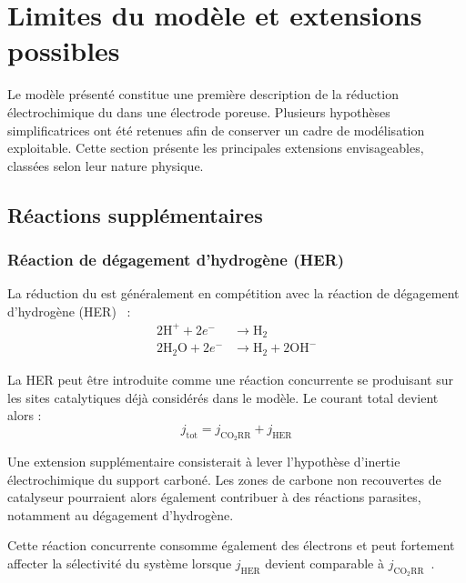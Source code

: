 \section*{Limites du modèle et extensions possibles}

Le modèle présenté constitue une première description de la réduction
électrochimique du  dans une électrode poreuse. Plusieurs
hypothèses simplificatrices ont été retenues afin de conserver un cadre
de modélisation exploitable. Cette section présente les principales
extensions envisageables, classées selon leur nature physique.

\subsection*{Réactions supplémentaires}

\subsubsection*{Réaction de dégagement d'hydrogène (HER)}

La réduction du  est généralement en compétition avec la
réaction de dégagement d'hydrogène (HER)~\cite{goyalCompetitionCO2Reduction2020} :
\begin{align*}
2\mathrm{H}^+ + 2e^- &\longrightarrow \mathrm{H}_2 \\
2\mathrm{H_2O} + 2e^- &\longrightarrow \mathrm{H}_2 + 2\mathrm{OH}^-
\end{align*}

La HER peut être introduite comme une réaction concurrente se
produisant sur les sites catalytiques déjà considérés dans le modèle.
Le courant total devient alors :
\begin{equation}
j_{\mathrm{tot}}
=
j_{\mathrm{CO_2RR}}
+
j_{\mathrm{HER}}
\end{equation}

Une extension supplémentaire consisterait à lever l'hypothèse d'inertie
électrochimique du support carboné. Les zones de carbone non recouvertes de
catalyseur pourraient alors également contribuer à des réactions parasites,
notamment au dégagement d'hydrogène.

Cette réaction concurrente consomme également des électrons et peut
fortement affecter la sélectivité du système lorsque
$j_{\mathrm{HER}}$ devient comparable à
$j_{\mathrm{CO_2RR}}$~\cite{marcandalliElectrolyteEffectsCO22022}.


